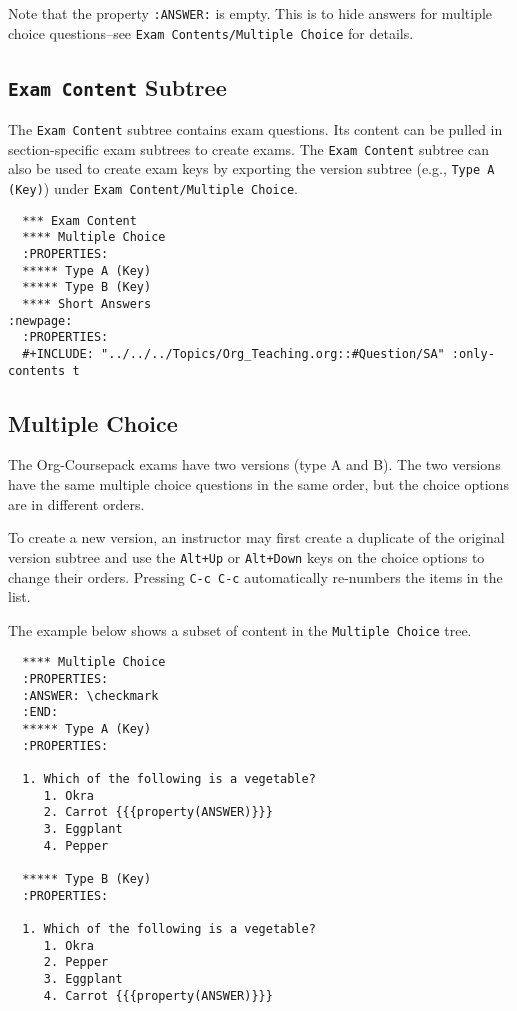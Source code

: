 \documentclass[10pt,article]{article}
\begin{document}
\begin{mdframed}
Note that the property \texttt{:ANSWER:} is empty. This is to hide answers for
multiple choice questions--see \texttt{Exam Contents/Multiple Choice} for details.
\end{mdframed}

\subsection{\texttt{Exam Content} Subtree}
\label{sec:org60740ef}
The \texttt{Exam Content} subtree contains exam questions. Its content can be
pulled in section-specific exam subtrees to create exams. The \texttt{Exam Content} subtree
can also be used to create exam keys by exporting the version subtree
(e.g., \texttt{Type A (Key)}) under \texttt{Exam Content/Multiple Choice}. 

{\small
\begin{verbatim}
  *** Exam Content
  **** Multiple Choice
  :PROPERTIES:
  ***** Type A (Key)
  ***** Type B (Key)
  **** Short Answers                                                  :newpage:
  :PROPERTIES:
  #+INCLUDE: "../../../Topics/Org_Teaching.org::#Question/SA" :only-contents t
\end{verbatim}
}
\subsection{Multiple Choice}
\label{sec:org738bb5d}
The Org-Coursepack exams have two versions (type A and B). The two
versions have the same multiple choice questions in the same order,
but the choice options are in different orders. 

\begin{mdframed}
To create a new version, an instructor may first create a duplicate of the
original version subtree and use the \texttt{Alt+Up} or \texttt{Alt+Down} keys on the choice
options to change their orders. Pressing \texttt{C-c C-c} automatically re-numbers the
items in the list.
\end{mdframed}

The example below shows a
subset of content in the \texttt{Multiple Choice} tree.

{\small
\begin{verbatim}
  **** Multiple Choice
  :PROPERTIES:
  :ANSWER: \checkmark
  :END:
  ***** Type A (Key)
  :PROPERTIES:

  1. Which of the following is a vegetable?
     1. Okra
     2. Carrot {{{property(ANSWER)}}}
     3. Eggplant
     4. Pepper

  ***** Type B (Key)
  :PROPERTIES:

  1. Which of the following is a vegetable?
     1. Okra
     2. Pepper
     3. Eggplant
     4. Carrot {{{property(ANSWER)}}}
\end{verbatim}
}
\end{document}
